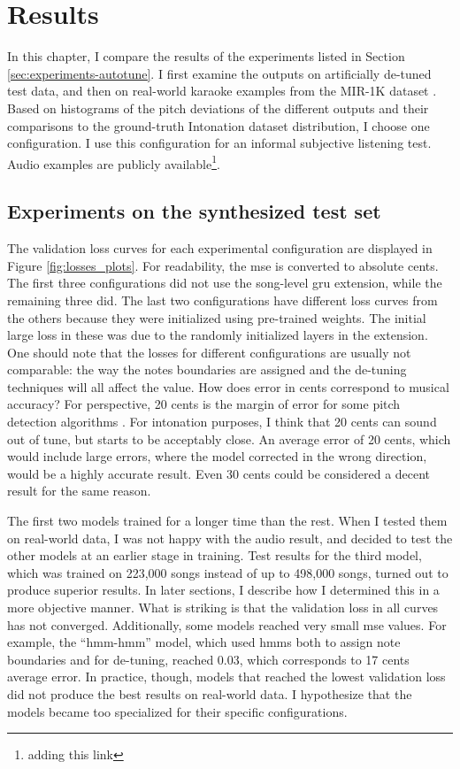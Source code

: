 \chapter{Results}
\label{chap:results}
In this chapter, I compare the results of the experiments listed in Section \ref{sec:experiments-autotune}. I first examine the outputs on artificially de-tuned test data, and then on real-world karaoke examples from the MIR-1K dataset \cite{hsu2009improvement}. Based on histograms of the pitch deviations of the different outputs and their comparisons to the ground-truth Intonation dataset distribution, I choose one configuration. I use this configuration for an informal subjective listening test. Audio examples are publicly available\footnote{adding this link}.

\section{Experiments on the synthesized test set}

The validation loss curves for each experimental configuration are displayed in Figure \ref{fig:losses_plots}. For readability, the \gls{mse} is converted to absolute cents. The first three configurations did not use the song-level \gls{gru} extension, while the remaining three did. The last two configurations have different loss curves from the others because they were initialized using pre-trained weights. The initial large loss in these was due to the randomly initialized layers in the extension. One should note that the losses for different configurations are usually not comparable: the way the notes boundaries are assigned and the de-tuning techniques will all affect the value. How does error in cents correspond to musical accuracy? For perspective, 20 cents is the margin of error for some pitch detection algorithms \cite{kim2018crepe}. For intonation purposes, I think that 20 cents can sound out of tune, but starts to be acceptably close. An average error of 20 cents, which would include large errors, where the model corrected in the wrong direction, would be a highly accurate result. Even 30 cents could be considered a decent result for the same reason. 

The first two models trained for a longer time than the rest. When I tested them on real-world data, I was not happy with the audio result, and decided to test the other models at an earlier stage in training. Test results for the third model, which was trained on 223,000 songs instead of up to 498,000 songs, turned out to produce superior results. In later sections, I describe how I determined this in a more objective manner. What is striking is that the validation loss in all curves has not converged. Additionally, some models reached very small \gls{mse} values. For example, the ``\gls{hmm}-\gls{hmm}'' model, which used \gls{hmm}s both to assign note boundaries and for de-tuning, reached 0.03, which corresponds to 17 cents average error. In practice, though, models that reached the lowest validation loss did not produce the best results on real-world data. I hypothesize that the models became too specialized for their specific configurations. 

